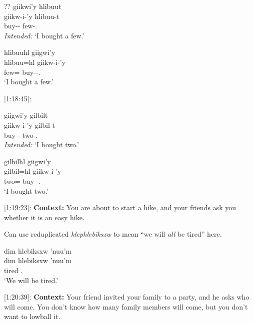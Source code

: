 \begin{exe}
    \ex 
    \begin{xlist}
    \item  \glll ?? giikwi'y hlibuut \\
    {} giikw-i-'y hlibuu-t \\
    {}  buy-\Tr{}-\Fsg{} few-\Tsg{}.\Ii{}  \\
    \textit{Intended: }`I bought a few.'

    \item     \glll hlibuuhl giigwi'y \\
    hlibuu=hl giikw-i-'y \\
    few=\Cn{} buy-\Tr{}-\Fsg{}.\Ii{} \\
    `I bought a few.'
    \end{xlist}
\end{exe}

[1:18:45]:

\begin{exe}
    \ex 
    \begin{xlist}
    \item  \glll * giigwi'y gilbilt \\
    {} giikw-i-'y gilbil-t \\
    {}  buy-\Tr{}-\Fsg{} two-\Tsg{}.\Ii{}  \\
    \textit{Intended: }`I bought two.'

    \item     \glll gilbilhl giigwi'y \\
    gilbil=hl giikw-i-'y \\
    two=\Cn{} buy-\Tr{}-\Fsg{}.\Ii{} \\
    `I bought two.'
    \end{xlist}
\end{exe}

[1:19:23]: \textbf{Context: }You are about to start a hike, and your friends ask you whether it is an easy hike.

Can use reduplicated \textit{hlephlebiksxw} to mean ``we will \textit{all} be tired'' here.

\begin{exe}
    \ex \glll dim hlebiksxw 'nuu'm \\
    dim hlebiksxw 'nuu'm \\
    \Prosp{} tired \Fpl{}.\Iii{} \\
    `We will be tired.'
\end{exe}

[1:20:39]: \textbf{Context: }Your friend invited your family to a party, and he asks who will come. You don't know how many family members will come, but you don't want to lowball it. 


